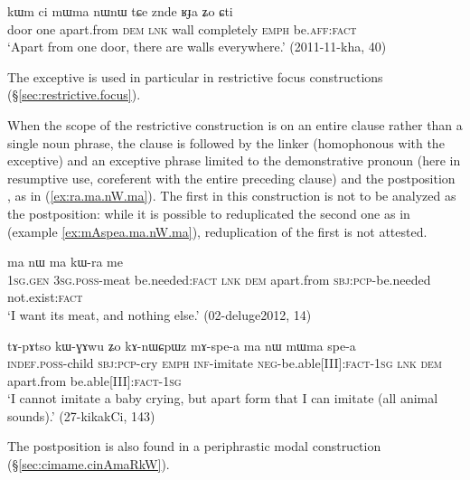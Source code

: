  \begin{exe}
 \ex \label{ex:kWm.ci.mWma}
 \gll kɯm ci mɯma nɯnɯ tɕe znde ʁɟa ʑo ɕti \\
 door one apart.from \textsc{dem} \textsc{lnk} wall completely \textsc{emph} be.\textsc{aff}:\textsc{fact} \\
 \glt `Apart from one door, there are walls everywhere.' (2011-11-kha, 40)
\end{exe}

The exceptive  is used in particular in restrictive focus constructions (§\ref{sec:restrictive.focus}).

When the scope of the restrictive construction is on an entire clause rather than a single noun phrase, the clause is followed by the linker  (homophonous with the exceptive) and an exceptive phrase limited to the demonstrative pronoun  (here in resumptive use, coreferent with the entire preceding clause) and the postposition , as in (\ref{ex:ra.ma.nW.ma}). The first  in this construction is not to be analyzed as the postposition: while it is possible to reduplicated the second one as in  (example \ref{ex:mAspea.ma.nW.ma}), reduplication of the first  is not attested.

 \begin{exe}
 \ex \label{ex:ra.ma.nW.ma}
 \gll [aʑɯɣ ɯ-ɕa ra] ma nɯ ma kɯ-ra me \\
 \textsc{1sg}.\textsc{gen} \textsc{3sg}.\textsc{poss}-meat be.needed:\textsc{fact} \textsc{lnk} \textsc{dem} apart.from \textsc{sbj}:\textsc{pcp}-be.needed not.exist:\textsc{fact} \\
 \glt `I want its meat, and nothing else.' (02-deluge2012, 14)
\end{exe}

 \begin{exe}
 \ex \label{ex:mAspea.ma.nW.ma}
 \gll tɤ-pɤtso kɯ-ɣɤwu ʑo kɤ-nɯɕpɯz mɤ-spe-a ma nɯ mɯma spe-a \\
 \textsc{indef}.\textsc{poss}-child \textsc{sbj}:\textsc{pcp}-cry \textsc{emph} \textsc{inf}-imitate \textsc{neg}-be.able[III]:\textsc{fact}-\textsc{1sg} \textsc{lnk} \textsc{dem} apart.from be.able[III]:\textsc{fact}-\textsc{1sg}  \\
\glt  `I cannot imitate a baby crying, but apart form that I can imitate (all animal sounds).' (27-kikakCi, 143)
\end{exe}

The postposition  is also found in a periphrastic modal construction   (§\ref{sec:cimame.cinAmaRkW}).

